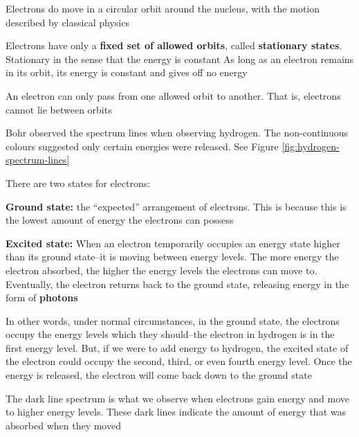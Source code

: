 \begin{bulleted-list}
    \item Electrons do move in a circular orbit around the nucleus, with the motion described
        by classical physics
    \item Electrons have only a \textbf{fixed set of allowed orbits}, called \textbf{stationary states}.
        Stationary in the sense that the energy is constant
        As long as an electron remains in its orbit, its energy is constant and gives off no energy
    \item An electron can only pass from one allowed orbit to another. That is, electrons cannot
        lie between orbits
    \item Bohr observed the spectrum lines when observing hydrogen. The non-continuous
        colours suggested only certain energies were released. See Figure \ref{fig:hydrogen-spectrum-lines}
    \item There are two states for electrons:
        \begin{enum}
            \item \textbf{Ground state:} the ``expected'' arrangement of electrons. This is because
                this is the lowest amount of energy the electrons can possess
            \item \textbf{Excited state:} When an electron temporarily occupies an energy state higher
                than its ground state--it is moving between energy levels. The more energy the 
                electron absorbed, the higher the energy levels the electrons can move to.
                Eventually, the electron returns back to the ground state, releasing energy
                in the form of \textbf{photons}
            \item In other words, under normal circumstances, in the ground state, the electrons
                occupy the energy levels which they should--the electron in hydrogen is in the first
                energy level. But, if we were to add energy to hydrogen, the excited state of
                the electron could occupy the second, third, or even fourth energy level. Once
                the energy is released, the electron will come back down to the ground state
            \item The dark line spectrum is what we observe when electrons gain energy and move
                to higher energy levels. These dark lines indicate the amount of energy that was
                absorbed when they moved
        \end{enum}
\end{bulleted-list}

